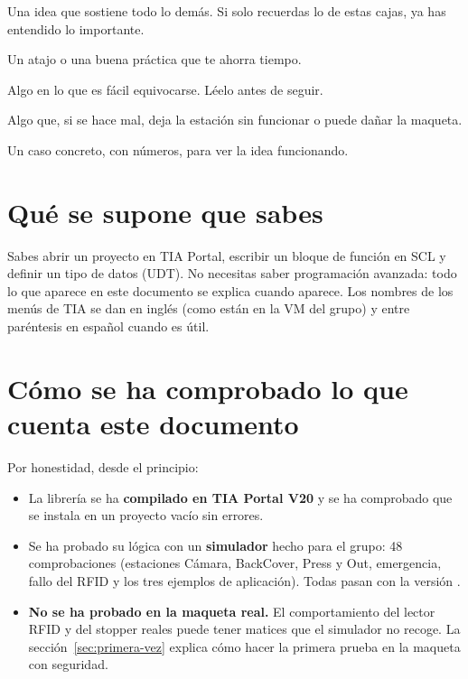 \begin{idea}
Una idea que sostiene todo lo demás. Si solo recuerdas lo de estas cajas, ya has entendido lo importante.
\end{idea}
\begin{consejo}
Un atajo o una buena práctica que te ahorra tiempo.
\end{consejo}
\begin{ojo}
Algo en lo que es fácil equivocarse. Léelo antes de seguir.
\end{ojo}
\begin{peligro}
Algo que, si se hace mal, deja la estación sin funcionar o puede dañar la maqueta.
\end{peligro}
\begin{ejemplo}
Un caso concreto, con números, para ver la idea funcionando.
\end{ejemplo}

\section*{Qué se supone que sabes}
Sabes abrir un proyecto en TIA Portal, escribir un bloque de función en SCL y definir un tipo de datos (UDT). No necesitas saber programación avanzada: todo lo que aparece en este documento se explica cuando aparece. Los nombres de los menús de TIA se dan en inglés (como están en la VM del grupo) y entre paréntesis en español cuando es útil.

\section*{Cómo se ha comprobado lo que cuenta este documento}
Por honestidad, desde el principio:
\begin{itemize}
\item La librería se ha \textbf{compilado en TIA Portal V20} y se ha comprobado que se instala en un proyecto vacío sin errores.
\item Se ha probado su lógica con un \textbf{simulador} hecho para el grupo: 48 comprobaciones (estaciones Cámara, BackCover, Press y Out, emergencia, fallo del RFID y los tres ejemplos de aplicación). Todas pasan con la versión \vlib.
\item \textbf{No se ha probado en la maqueta real.} El comportamiento del lector RFID y del stopper reales puede tener matices que el simulador no recoge. La sección~\ref{sec:primera-vez} explica cómo hacer la primera prueba en la maqueta con seguridad.
\end{itemize}
